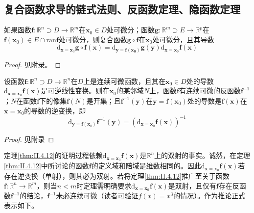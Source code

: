 \documentclass[main.tex]{subfiles}
\begin{document}
\subsection{复合函数求导的链式法则、反函数定理、隐函数定理}
\begin{theorem}[复合函数求导的链式法则]\label{thm:II.4.11}
    如果函数$\mathbf{f}:\mathbb{R}^n\supset D\rightarrow\mathbb{R}^m$在$\mathbf{x}_0\in D$处可微分；函数$\mathbf{g}:\mathbb{R}^m\supset E\rightarrow\mathbb{R}^p$在$\mathbf{f}\left(\mathbf{x}_0\right)\in E\cap \mathrm{ran}\mathbf{f}$处可微分，则复合函数$\mathbf{g}\circ\mathbf{f}$在$\mathbf{x}_0$处可微分，且其导数
    \[\mathrm{d}_{\mathbf{x}=\mathbf{x}_0}\mathbf{g}\circ\mathbf{f}\left(\mathbf{x}\right)=\mathrm{d}_{\mathbf{y=\mathbf{f}\left(\mathbf{x}_0\right)}}\mathbf{g}\left(\mathbf{y}\right)\mathrm{d}_{\mathbf{x}=\mathbf{x}_0}\mathbf{f}\left(\mathbf{x}\right)\]
\end{theorem}
\begin{proof}
    见附录。
\end{proof}

\begin{theorem}[反函数定理]\label{thm:II.4.12}
    设函数$\mathbf{f}:\mathbb{R}^n\supset D\rightarrow\mathbb{R}^n$在$D$上是连续可微函数，且其在$\mathbf{x}_0\in D$处的导数$\mathrm{d}_{\mathbf{x}=\mathbf{x}_0}\mathbf{f}\left(\mathbf{x}\right)$是可逆线性变换。则在$\mathbf{x}_0$的某邻域$N$上，函数$\mathbf{f}$有连续可微的反函数$\mathbf{f}^{-1}$；$N$在函数$\mathbf{f}$下的像集$\mathbf{f}\left(N\right)$是开集；且$\mathbf{f}^{-1}\left(\mathbf{y}\right)$在$\mathbf{y}=\mathbf{f}\left(\mathbf{x}_0\right)$处的导数是$\mathbf{f}\left(\mathbf{x}\right)$在$\mathbf{x}=\mathbf{x}_0$的导数的逆变换，即
    \[\mathrm{d}_{\mathbf{y}=\mathbf{f}\left(\mathbf{x}_0\right)}\mathbf{f}^{-1}\left(\mathbf{y}\right)=\left(\mathrm{d}_{\mathbf{x}=\mathbf{x}_0}\mathbf{f}\left(\mathbf{x}\right)\right)^{-1}\]
\end{theorem}
\begin{proof}
    见附录
\end{proof}

定理\ref{thm:II.4.12}的证明过程依赖$\mathrm{d}_{\mathbf{x}=\mathbf{x}_0}\mathbf{f}\left(\mathbf{x}\right)$是$\mathbb{R}^n$上的双射的事实。诚然，在定理\ref{thm:II.4.12}中所讨论的函数$\mathbf{f}$的定义域和陪域是维数相同的。因此$\mathrm{d}_{\mathbf{x}=\mathbf{x}_0}\mathbf{f}\left(\mathbf{x}\right)$若存在逆变换（单射），则其必为双射。若将定理\ref{thm:II.4.12}推广至关于函数$\mathbf{f}:\mathbb{R}^n\rightarrow\mathbb{R}^m$，则当$n<m$时定理需明确要求$\mathrm{d}_{\mathbf{x}=\mathbf{x}_0}\mathbf{f}\left(\mathbf{x}\right)$是双射，且仅有$\mathbf{f}$存在反函数$\mathbf{f}^{-1}$的结论，$\mathbf{f}^{-1}$未必连续可微（读者可验证$f\left(x\right)=x^3$的情况）。作为推论正式表示如下。
\end{document}
